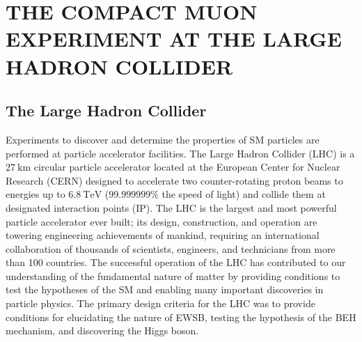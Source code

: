 
\chapter{THE COMPACT MUON EXPERIMENT AT THE LARGE HADRON COLLIDER}
\label{The_CMS_Experiment_at_the_LHC}

\section{The Large Hadron Collider}
Experiments to discover and determine the properties of SM particles are performed at particle accelerator facilities.
The Large Hadron Collider (LHC) is a $\SI{27}{\km}$ circular particle accelerator located at the European Center for Nuclear Research (CERN) designed to accelerate two counter-rotating proton beams to energies up to $\SI{6.8}{\TeV}$ ($99.999999\%$ the speed of light) and collide them at designated interaction points (IP).
The LHC is the largest and most powerful particle accelerator ever built; its design, construction, and operation are towering engineering achievements of mankind, requiring an international collaboration of thousands of scientists, engineers, and technicians from more than 100 countries.
The successful operation of the LHC has contributed to our understanding of the fundamental nature of matter by providing conditions to test the hypotheses of the SM and enabling many important discoveries in particle physics.
The primary design criteria for the LHC was to provide conditions for elucidating the nature of EWSB, testing the hypothesis of the BEH mechanism, and discovering the Higgs boson.

